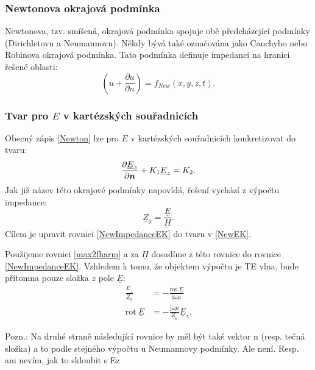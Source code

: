 \documentclass[12pt,a4paper,oneside]{article}
\numberwithin{equation}{section} %
\numberwithin{figure}{section} %
\numberwithin{table}{section} %
\newcommand{\mj}{\mathrm{j}} %
\renewcommand{\vec}[1]{\mbox{\boldmath$#1$}} %
\newcommand{\faz}[1]{{\underline{#1}}} %
\newcommand{\rot}{\mathrm{rot}\ }
\begin{document}
\subsubsection{Newtonova okrajová podmínka}
Newtonova, tzv. smíšená, okrajová podmínka spojuje obě předcházející podmínky (Dirichletovu a Neumannovu). Někdy bývá také označována jako Cauchyho nebo Robinova okrajová podmínka. Tato podmínka definuje impedanci na hranici řešené oblasti:
\begin{equation}
\label{Newton}
\left( u + \frac{\partial u}{\partial n} \right) = f _{New} (x, y, z, t) .
\end{equation}  


\subsubsection*{Tvar pro \faz{\vec{E}} v kartézských souřadnicích}
Obecný zápis \ref{Newton} lze pro \faz{\vec{E}} v kartézských souřadnicích konkretizovat do tvaru:
\begin{equation}
\label{NewEK}
\frac{\partial \faz{E} _z}{\partial \vec{n}} + K_1 \faz{E} _z = K_2 .
\end{equation}
Jak již název této okrajové podmínky napovídá, řešení vychází z výpočtu impedance: 
\begin{equation}
\label{NewImpedanceEK}
\faz{Z} _0 = \frac{\faz{E}}{\faz{H}} .
\end{equation}
Cílem je upravit rovnici \ref{NewImpedanceEK} do tvaru v \ref{NewEK}.

Použijeme rovnici \ref{max2fharm} a za $\faz{H}$ dosadíme z této rovnice do rovnice \ref{NewImpedanceEK}. Vzhledem k tomu, že objektem výpočtu je TE vlna, bude přítomna pouze složka $z$ pole $\faz{E}$:
\begin{subequations}
\begin{align}
\frac{\faz{E} _z}{\faz{Z} _0} &= - \frac{\rot \! \faz{E}}{\mj \omega \mu}
\\
\rot \! \faz{E} &= - \frac{\mj \omega \mu}{\faz{Z} _0} \faz{E} _z .
\end{align}
\end{subequations}

\begin{spverbatim}
Pozn.: Na druhé straně  následující rovnice by měl být také vektor n (resp. tečná složka) a to podle stejného výpočtu u Neumannovy podmínky. Ale není. Resp. ani nevím, jak to skloubit s Ez
\end{spverbatim}
\end{document}
